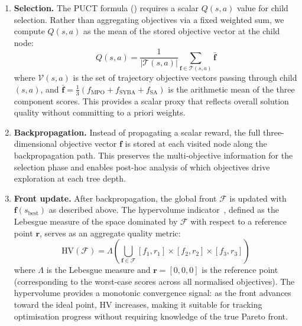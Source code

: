 \documentclass[jcim,article,layout=manuscript]{achemso}
\begin{document}
\begin{enumerate}
  \item \textbf{Selection.} The PUCT formula () requires a
    scalar $Q(s,a)$ value for child selection. Rather than aggregating
    objectives via a fixed weighted sum, we compute $Q(s,a)$ as the mean
    of the stored objective vector at the child node:
    \begin{equation}
      Q(s,a) = \frac{1}{|\mathcal{T}(s,a)|} \sum_{\mathbf{f} \in \mathcal{T}(s,a)} \bar{\mathbf{f}}
      \label{eq:pareto_q}
    \end{equation}
    where $\mathcal{V}(s,a)$ is the set of trajectory objective vectors
    passing through child $(s,a)$, and $\bar{\mathbf{f}} = \frac{1}{3}
    \left(f_{\text{MPO}} + f_{\text{SYBA}} + f_{\text{SA}}\right)$ is
    the arithmetic mean of the three component scores. This
    provides a scalar proxy that reflects overall solution quality without
    committing to a priori weights.
  \item \textbf{Backpropagation.} Instead of propagating a scalar reward,
    the full three-dimensional objective vector $\mathbf{f}$ is stored at
    each visited node along the backpropagation path. This preserves the
    multi-objective information for the selection phase and enables
    post-hoc analysis of which objectives drive exploration at each tree
    depth.
  \item \textbf{Front update.} After backpropagation, the global front
    $\mathcal{F}$ is updated with $\mathbf{f}(s_{\text{best}})$ as
    described above. The hypervolume indicator~\cite{Zitzler2003},
    defined as the Lebesgue measure of the space dominated by
    $\mathcal{F}$ with respect to a reference point $\mathbf{r}$,
    serves as an aggregate quality metric:
    \begin{equation}
      \text{HV}(\mathcal{F}) = \Lambda\left(\bigcup_{\mathbf{f} \in \mathcal{F}} [f_1, r_1] \times [f_2, r_2] \times [f_3, r_3]\right)
      \label{eq:hypervolume}
    \end{equation}
    where $\Lambda$ is the Lebesgue measure and $\mathbf{r} = [0, 0, 0]$
    is the reference point (corresponding to the worst-case scores across
    all normalised objectives). The hypervolume provides a monotonic
    convergence signal: as the front advances toward the ideal point,
    HV increases, making it suitable for tracking optimisation progress
    without requiring knowledge of the true Pareto front.
\end{enumerate}
\end{document}
